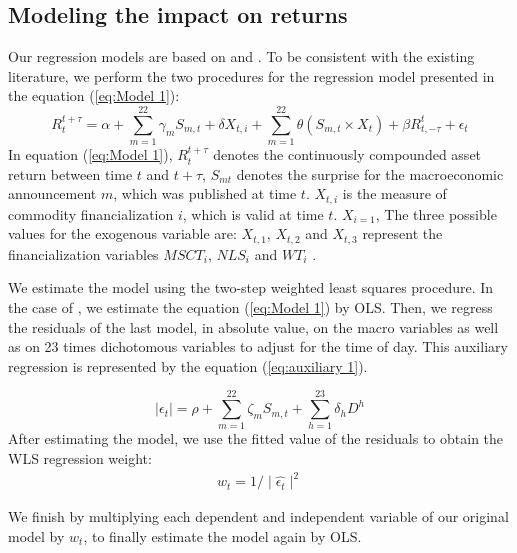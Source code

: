 \documentclass[12pt]{article}
\begin{document}
\subsection{Modeling the impact on returns}\label{return}
Our regression models are based on \citet{kurov2019price} and \citet{andersen2007real}. To be consistent with the existing literature, we perform the two procedures for the regression model presented in the equation (\ref{eq:Model 1}):
\begin{equation}\label{eq:Model 1}
R_{t}^{t+\tau}=\alpha+\sum_{m=1}^{22} \gamma_m S_{m,t}+ \delta X_{t,i} + \sum_{m=1}^{22} \theta (S_{m,t} \times X_t)+\beta R_{t,-\tau}^{t}+\epsilon_{t} 
\end{equation}
In equation (\ref{eq:Model 1}), $R_{t}^{t+\tau}$ denotes the continuously compounded asset return between time $t$ and $t+\tau$, $S_{mt}$ denotes the surprise for the macroeconomic announcement $m$, which was published at time $t$. $X_{t,i}$ is the measure of commodity financialization $i$,  which is valid at time $t$. $X_{i = 1}$, The three possible values for the exogenous variable are:  $X_{t,1}$, $X_{t,2}$ and $X_{t,3}$ represent the financialization variables $MSCT_i$, $NLS_i$ and $WT_i$ . 

We estimate the model using the two-step weighted least squares procedure. In the case of \citet{andersen2007real}, we estimate the equation (\ref{eq:Model 1}) by OLS. Then, we regress the residuals of the last model, in absolute value, on the macro variables as well as on 23 times dichotomous variables to adjust for the time of day. This auxiliary regression is represented by the equation (\ref{eq:auxiliary 1}).

\begin{equation}\label{eq:auxiliary 1}
\mid \epsilon_{t} \mid=\rho+\sum_{m=1}^{22} \zeta_m S_{m,t}+\sum_{h=1}^{23} \delta_h D^h
\end{equation}
After estimating the model, we use the fitted value of the residuals to obtain the WLS regression weight:
\begin{align*}
w_t=1/\mid \hat{\epsilon_t} \mid^2
\end{align*}

We finish by multiplying each dependent and independent variable of our original model by $w_t$, to finally estimate the model again by OLS.
\end{document}
